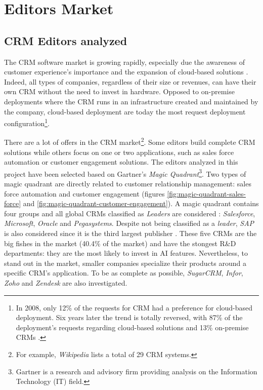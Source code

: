 \section{Editors Market}


\subsection{CRM Editors analyzed}
The CRM software market is growing rapidly, especially due the awareness of customer experience's importance and the expansion of cloud-based solutions \cite{crm-revenue}. Indeed, all types of companies, regardless of their size or revenues, can have their own CRM without the need to invest in hardware. Opposed to on-premise deployments where the CRM runs in an infrastructure created and maintained by the company, cloud-based deployment are today the most request deployment configuration\footnote{In 2008, only 12\% of the requests for CRM had a preference for cloud-based deployment. Six years later the trend is totally reversed, with 87\% of the deployment's requests regarding cloud-based solutions and 13\% on-premise CRMs \cite{crm-deployment-stats}.}.

There are a lot of offers in the CRM market\footnote{For example, \textit{Wikipedia} lists a total of 29 CRM systems.}. Some editors build complete CRM solutions while others focus on one or two applications, such as sales force automation or customer engagement solutions. The editors analyzed in this project have been selected based on Gartner's \textit{Magic Quadrant}\footnote{Gartner is a research and advisory firm providing analysis on the Information Technology (IT) field.}. Two types of magic quadrant are directly related to customer relationship management: sales force automation and customer engagement (figures \ref{fig:magic-quadrant-sales-force} and \ref{fig:magic-quadrant-customer-engagement}). A magic quadrant contains four groups and all global CRMs classified as \textit{Leaders} are considered : \textit{Salesforce}, \textit{Microsoft}, \textit{Oracle} and \textit{Pegasystems}. Despite not being classified as a \textit{leader}, \textit{SAP} is also considered since it is the third largest publisher \cite{crm-market-share}. These five CRMs are the big fishes in the market (40.4\% of the market) and have the stongest R&D departments: they are the most likely to invest in AI features. Nevertheless, to stand out in the market, smaller companies specialize their products around a specific CRM's application. To be as complete as possible, \textit{SugarCRM}, \textit{Infor}, \textit{Zoho} and \textit{Zendesk} are also investigated.

